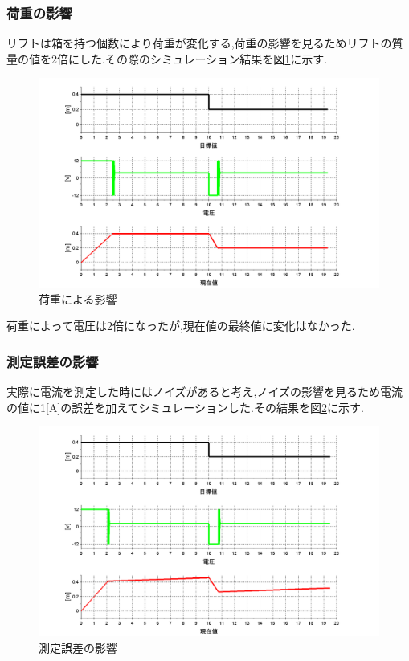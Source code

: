 \subsubsection{荷重の影響}
リフトは箱を持つ個数により荷重が変化する,荷重の影響を見るためリフトの質量の値を2倍にした.その際のシミュレーション結果を図\ref{fig:sim4}に示す.

\begin{figure}[htbp]
 \begin{center}
    \includegraphics[width=150mm]{img/sim4.bmp}
    \end{center}
  \caption{荷重による影響}
 \label{fig:sim4}
\end{figure}

荷重によって電圧は2倍になったが,現在値の最終値に変化はなかった.

\subsubsection{測定誤差の影響}
実際に電流を測定した時にはノイズがあると考え,ノイズの影響を見るため電流の値に1[A]の誤差を加えてシミュレーションした.その結果を図\ref{fig:sim5}に示す.

\begin{figure}[htbp]
 \begin{center}
    \includegraphics[width=150mm]{img/sim5.bmp}
    \end{center}
  \caption{測定誤差の影響}
 \label{fig:sim5}
\end{figure}

